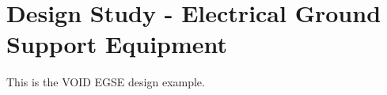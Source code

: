 \chapter{Design Study - Electrical Ground Support Equipment}\label{CH:Design3}
This is the VOID EGSE design example.